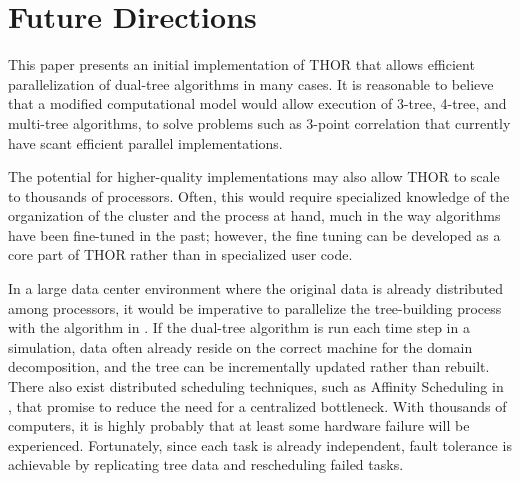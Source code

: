 \documentclass[twoside,leqno,twocolumn]{article}
\newcommand{\fig}[1]{Figure~\ref{fig:#1}}
\begin{document}



\section{Future Directions}

This paper presents an initial implementation of THOR that allows efficient parallelization of dual-tree algorithms in many cases.
It is reasonable to believe that a modified computational model would allow execution of 3-tree, 4-tree, and multi-tree algorithms, to solve problems such as 3-point correlation that currently have scant efficient parallel implementations.

The potential for higher-quality implementations may also allow THOR to scale to thousands of processors.
Often, this would require specialized knowledge of the organization of the cluster and the process at hand, much in the way algorithms have been fine-tuned in the past; however, the fine tuning can be developed as a core part of THOR rather than in specialized user code.

In a large data center environment where the original data is already distributed among processors, it would be imperative to parallelize the tree-building process with the algorithm in \cite{alfuraih00parallel}.
If the dual-tree algorithm is run each time step in a simulation, data often already reside on the correct machine for the domain decomposition, and the tree can be incrementally updated rather than rebuilt.
There also exist distributed scheduling techniques, such as Affinity Scheduling in \cite{markatos92using}, that promise to reduce the need for a centralized bottleneck.
With thousands of computers, it is highly probably that at least some hardware failure will be experienced.
Fortunately, since each task is already independent, fault tolerance is achievable by replicating tree data and rescheduling failed tasks.
\end{document}
